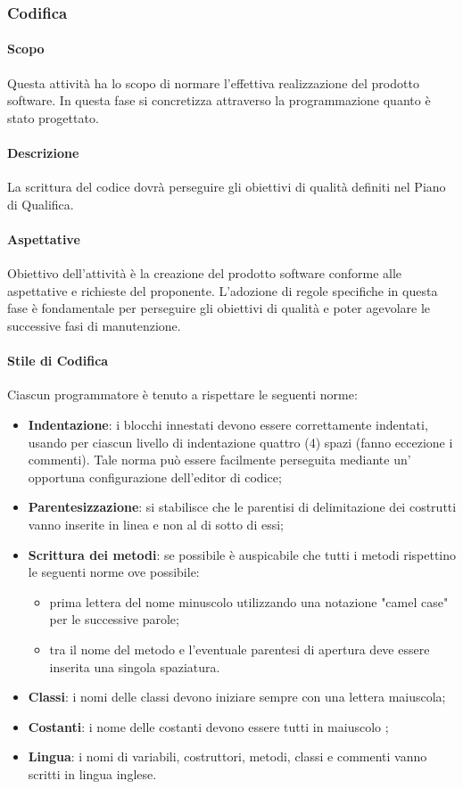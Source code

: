 \subsubsection{Codifica}
\paragraph{Scopo}
Questa attività ha lo scopo di normare l'effettiva realizzazione del prodotto software.  In questa fase si concretizza attraverso la programmazione quanto è stato progettato.

\paragraph{Descrizione}
La scrittura del codice dovrà perseguire gli obiettivi di qualità definiti nel Piano di Qualifica.

\paragraph{Aspettative}
Obiettivo dell'attività è la creazione del prodotto software conforme alle aspettative e richieste del proponente.  L'adozione di regole specifiche in questa fase è fondamentale per perseguire gli obiettivi di qualità e poter agevolare le successive fasi di manutenzione.

\paragraph{Stile di Codifica}
Ciascun programmatore è tenuto a rispettare le seguenti norme:

\begin{itemize}
\item \textbf{Indentazione}: i blocchi innestati devono essere correttamente indentati, usando per ciascun livello di indentazione quattro (4) spazi (fanno eccezione i commenti).  Tale norma può essere facilmente perseguita mediante un' opportuna configurazione dell'editor di codice;
\item \textbf{Parentesizzazione}: si stabilisce che le parentisi di delimitazione dei costrutti vanno inserite in linea e non al di sotto di essi;
\item \textbf{Scrittura dei metodi}: se possibile è auspicabile che tutti i metodi rispettino le seguenti norme ove possibile:
\begin{itemize}
\item prima lettera del nome minuscolo utilizzando una notazione "camel case" per le successive parole;
\item tra il nome del metodo e l'eventuale parentesi di apertura deve essere inserita una singola spaziatura.
\end{itemize}
\item \textbf{Classi}: i nomi delle classi devono iniziare sempre con una lettera maiuscola;
\item \textbf{Costanti}: i nome delle costanti devono essere tutti in maiuscolo ;
\item \textbf{Lingua}: i nomi di variabili, costruttori, metodi, classi e commenti vanno scritti in lingua inglese.
\end{itemize}



